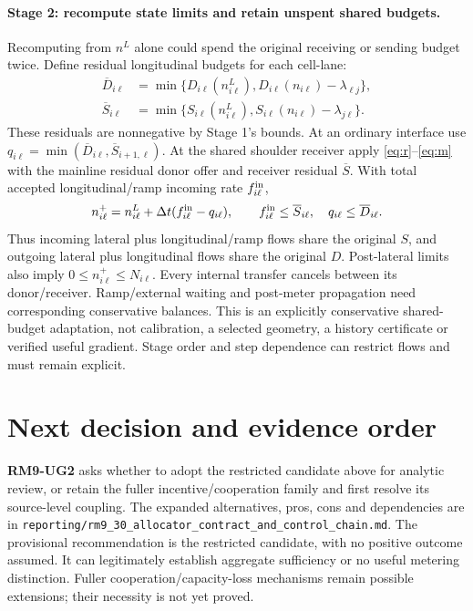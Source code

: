 \documentclass[10pt,a4paper]{article}
\begin{document}
\paragraph{Stage 2: recompute state limits and retain unspent shared budgets.}
Recomputing from $n^L$ alone could spend the original receiving or sending
budget twice. Define residual longitudinal budgets for each cell-lane:
\begin{align}
 \overline D_{i\ell}&=\min\{D_{i\ell}(n_{i\ell}^L),
 D_{i\ell}(n_{i\ell})-\lambda_{\ell j}\},\\
 \overline S_{i\ell}&=\min\{S_{i\ell}(n_{i\ell}^L),
 S_{i\ell}(n_{i\ell})-\lambda_{j\ell}\}.
\end{align}
These residuals are nonnegative by Stage 1's bounds. At an ordinary interface
use $q_{i\ell}=\min(\overline D_{i\ell},\overline S_{i+1,\ell})$.
At the shared shoulder receiver apply \eqref{eq:r}--\eqref{eq:m} with the
mainline residual donor offer and receiver residual $\overline S$.
With total accepted longitudinal/ramp incoming rate $f_{i\ell}^{\rm in}$,
\begin{equation}
 n_{i\ell}^{+}=n_{i\ell}^L+
 \Delta t(f_{i\ell}^{\rm in}-q_{i\ell}),\qquad
 f_{i\ell}^{\rm in}\leq\overline S_{i\ell},\quad
 q_{i\ell}\leq\overline D_{i\ell}.
\end{equation}
Thus incoming lateral plus longitudinal/ramp flows share the original $S$,
and outgoing lateral plus longitudinal flows share the original $D$.
Post-lateral limits also imply $0\leq n_{i\ell}^{+}\leq N_{i\ell}$.
Every internal transfer cancels between its donor/receiver. Ramp/external
waiting and post-meter propagation need corresponding conservative balances.
This is an explicitly conservative shared-budget adaptation, not calibration,
a selected geometry, a history certificate or verified useful gradient.
Stage order and step dependence can restrict flows and must remain explicit.
\newpage

\section{Next decision and evidence order}
\textbf{RM9-UG2} asks whether to adopt the restricted candidate above for
analytic review, or retain the fuller incentive/cooperation family and first
resolve its source-level coupling. The expanded alternatives, pros, cons and
dependencies are in \texttt{reporting/rm9\_30\_allocator\_contract\_and\_control\_chain.md}.
The provisional recommendation is the restricted candidate, with no positive
outcome assumed. It can legitimately establish aggregate sufficiency or no
useful metering distinction. Fuller cooperation/capacity-loss mechanisms remain
possible extensions; their necessity is not yet proved.
\end{document}
